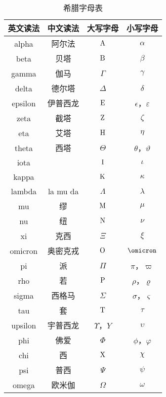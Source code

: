 \begin{issues}
\issueDraft
\end{issues}

\begin{table}[ht]
\centering
\caption{希腊字母表}\label{tab_GreekL1}
\begin{tabular}{|c|c|c|c|}
\hline
英文读法 & 中文读法 & 大写字母 & 小写字母 \\
\hline
alpha & 阿尔法 & ${\rm A}$ & $\alpha$ \\
\hline
beta & 贝塔 & ${\rm B}$ & $\beta$ \\
\hline
gamma & 伽马 & $\Gamma$ & $\gamma$ \\
\hline
delta & 德尔塔 &$\Delta$ & $\delta$ \\
\hline
epsilon & 伊普西龙 & ${\rm E}$ & $\epsilon$，$\varepsilon$ \\
\hline
zeta & 截塔 & ${\rm Z}$ & $\zeta$ \\
\hline
eta & 艾塔 & ${\rm H}$ & $\eta$ \\
\hline
theta & 西塔 & $\Theta$ & $\theta$，$\vartheta$ \\
\hline
iota & & ${\rm I}$ & $\iota$ \\
\hline
kappa & & ${\rm K}$ & $\kappa$ \\
\hline
lambda & la mu da&$\Lambda$ & $\lambda$ \\
\hline
mu & 缪 & ${\rm M}$ & $\mu$ \\
\hline
nu & 纽 & ${\rm N}$ & $\nu$ \\
\hline
xi & 克西 &$\Xi$ & $\xi$ \\
\hline
omicron & 奥密克戎 & ${\rm O}$ & $\omicron$ \\
\hline
pi & 派 &$\Pi$ & $\pi$，$\varpi$ \\
\hline
rho & 若 & ${\rm P}$ & $\rho$，$\varrho$ \\
\hline
sigma & 西格马 &$\Sigma$ & $\sigma$，$\varsigma$ \\
\hline
tau & 套 & ${\rm T}$ & $\tau$ \\
\hline
upsilon & 宇普西龙 & $\Upsilon$，${Y}$ & $\upsilon$ \\
\hline
phi & 佛爱 &$\Phi$ & $\phi$，$\varphi$ \\
\hline
chi & 西 & ${\rm X}$ & $\chi$ \\
\hline
psi & 普西&$\Psi$ & $\psi$ \\
\hline
omega & 欧米伽&$\Omega$ & $\omega$ \\
\hline
\end{tabular}
\end{table}




